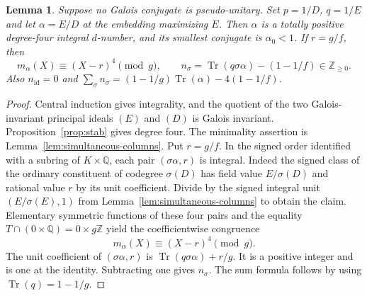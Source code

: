 \documentclass[11pt,a4paper]{article}
\newtheorem{lemma}[theorem]{Lemma}
\numberwithin{equation}{section}
\begin{document}
\begin{lemma}\label{lem:quartic-moments}
Suppose no Galois conjugate is pseudo-unitary. Set $p=1/D$, $q=1/E$ and let $\alpha=E/D$ at the embedding maximizing $E$. Then $\alpha$ is a totally positive degree-four integral $d$-number, and its smallest conjugate is $\alpha_0<1$. If $r=g/f$, then
\[
 m_\alpha(X)\equiv(X-r)^4\pmod g,\qquad
 n_\sigma=\operatorname{Tr}(q\sigma\alpha)-(1-1/f)\in\mathbb Z_{\ge0}.
\]
Also $n_{\mathrm{id}}=0$ and $\sum_\sigma n_\sigma=(1-1/g)\operatorname{Tr}(\alpha)-4(1-1/f)$.
\end{lemma}
\begin{proof}
Central induction gives integrality, and the quotient of the two Galois-invariant principal ideals $(E)$ and $(D)$ is Galois invariant. Proposition~\ref{prop:stab} gives degree four. The minimality assertion is Lemma~\ref{lem:simultaneous-columns}.
Put $r=g/f$. In the signed order identified with a subring of $K\times\mathbb Q$, each pair $(\sigma\alpha,r)$ is integral. Indeed the signed class of the ordinary constituent of codegree $\sigma(D)$ has field value $E/\sigma(D)$ and rational value $r$ by its unit coefficient. Divide by the signed integral unit $(E/\sigma(E),1)$ from
Lemma~\ref{lem:simultaneous-columns} to obtain the claim. Elementary symmetric functions of these four pairs and the equality $T\cap(0\times\mathbb Q)=0\times g\mathbb Z$ yield the coefficientwise congruence
\[
 m_\alpha(X)\equiv(X-r)^4\pmod g.
\]
The unit coefficient of $(\sigma\alpha,r)$ is $\operatorname{Tr}(q\sigma\alpha)+r/g$. It is a positive integer and is one at the identity. Subtracting one gives $n_\sigma$. The sum formula follows by using $\operatorname{Tr}(q)=1-1/g$.
\end{proof}



\end{document}
